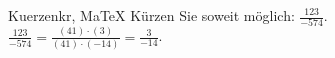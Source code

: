 \begin{MAufgabe}{Kuerzen}{kr, MaTeX}
K\"urzen Sie soweit m\"oglich: $\frac{123}{-574}$.\\ 
\ifLsg\MLoesung
\quad $\frac{123}{-574}=\frac{(41)\cdot(3)}{(41)\cdot(-14)}=\frac{3}{-14}$.\else\relax\fi
 \end{MAufgabe}